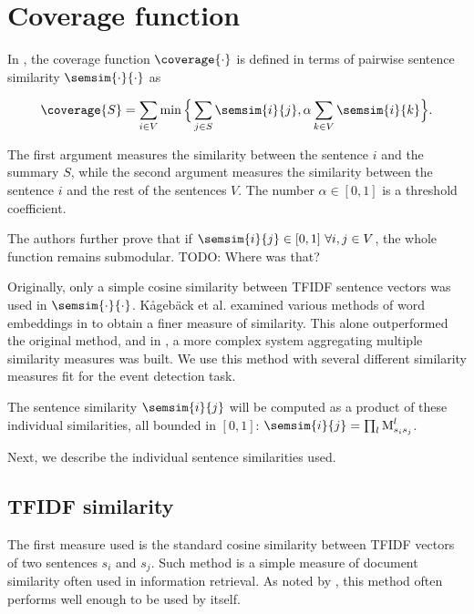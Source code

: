 \section{Coverage function}

In \cite{multi-summarization-2}, the coverage function $\coverage{\cdot}$ is defined in terms of pairwise sentence similarity $\semsim{\cdot}{\cdot}$ as

\begin{equation}
\coverage{S} = \sum_{i \in V}{\min{\Big\{ \sum_{j \in S}{\semsim{i}{j}}, \alpha \sum_{k \in V}{\semsim{i}{k}} \Big\} }}.
\end{equation}

The first argument measures the similarity between the sentence $i$ and the summary $S$, while the second argument measures the similarity between the sentence $i$ and the rest of the sentences $V$. The number $\alpha \in [0,1]$ is a threshold coefficient.

The authors further prove that if $\semsim{i}{j} \in [0,1]\ \forall i, j \in V$, the whole function remains submodular. {\color{red} TODO: Where was that?}

Originally, only a simple cosine similarity between TFIDF sentence vectors \cite{information-retrieval} was used in $\semsim{\cdot}{\cdot}$. Kågebäck et al. examined various methods of word embeddings in \cite{mogren-1} to obtain a finer measure of similarity. This alone outperformed the original method, and in \cite{mogren-2}, a more complex system aggregating multiple similarity measures was built. We use this method with several different similarity measures fit for the event detection task.

The sentence similarity $\semsim{i}{j}$ will be computed as a product of these individual similarities, all bounded in $[0, 1]$: $\semsim{i}{j} = \prod_{l}{\similarity_{s_{i}s_{j}}^{l}}$.

Next, we describe the individual sentence similarities used.

\subsection{TFIDF similarity}

The first measure used is the standard cosine similarity between TFIDF vectors \cite{information-retrieval} of two sentences $s_{i}$ and $s_{j}$. Such method is a simple measure of document similarity often used in information retrieval. As noted by \cite{multi-summarization-2}, this method often performs well enough to be used by itself.

